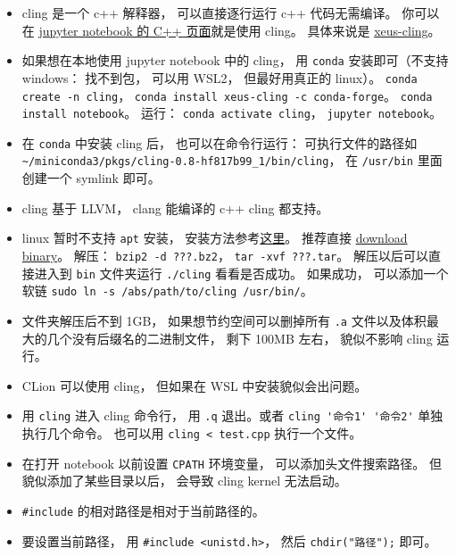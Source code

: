 
\begin{issues}
\issueDraft
\end{issues}

\begin{itemize}
\item cling 是一个 c++ 解释器， 可以直接逐行运行 c++ 代码无需编译。 你可以在 \href{https://jupyter.org/try}{jupyter notebook 的 C++ 页面}就是使用 cling。 具体来说是 \href{https://xeus-cling.readthedocs.io/en/latest/index.html}{xeus-cling}。
\item 如果想在本地使用 jupyter notebook 中的 cling， 用 \verb|conda| 安装即可（不支持 windows： 找不到包， 可以用 WSL2， 但最好用真正的 linux）。 \verb|conda create -n cling|， \verb|conda install xeus-cling -c conda-forge|。 \verb|conda install notebook|。 运行： \verb|conda activate cling|， \verb|jupyter notebook|。
\item 在 \verb|conda| 中安装 cling 后， 也可以在命令行运行： 可执行文件的路径如 \verb|~/miniconda3/pkgs/cling-0.8-hf817b99_1/bin/cling|， 在 \verb|/usr/bin| 里面创建一个 symlink 即可。
\item cling 基于 LLVM， clang 能编译的 c++ cling 都支持。
\item linux 暂时不支持 \verb|apt| 安装， 安装方法参考\href{https://kaustubh13.medium.com/how-to-install-cling-on-linux-or-wsl-8125798ed9b9}{这里}。 推荐直接 \href{https://root.cern/download/cling/}{download binary}。 解压： \verb|bzip2 -d ???.bz2|， \verb|tar -xvf ???.tar|。 解压以后可以直接进入到 \verb|bin| 文件夹运行 \verb|./cling| 看看是否成功。 如果成功， 可以添加一个软链 \verb|sudo ln -s /abs/path/to/cling /usr/bin/|。
\item 文件夹解压后不到 1GB， 如果想节约空间可以删掉所有 \verb|.a| 文件以及体积最大的几个没有后缀名的二进制文件， 剩下 100MB 左右， 貌似不影响 cling 运行。
\item CLion 可以使用 cling， 但如果在 WSL 中安装貌似会出问题。
\item 用 \verb|cling| 进入 cling 命令行， 用 \verb|.q| 退出。或者 \verb|cling '命令1' '命令2'| 单独执行几个命令。 也可以用 \verb|cling < test.cpp| 执行一个文件。
\item 在打开 notebook 以前设置 \verb|CPATH| 环境变量， 可以添加头文件搜索路径。 但貌似添加了某些目录以后， 会导致 cling kernel 无法启动。
\item \verb|#include| 的相对路径是相对于当前路径的。
\item 要设置当前路径， 用 \verb|#include <unistd.h>|， 然后 \verb|chdir("路径");| 即可。
\end{itemize}

